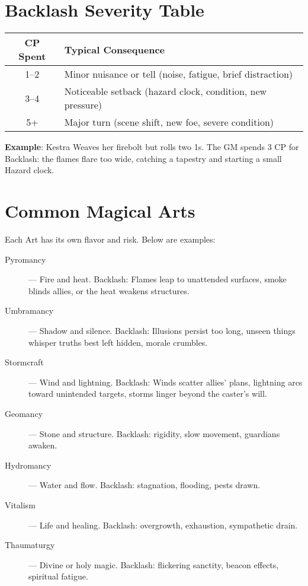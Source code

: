 \section*{Backlash Severity Table}

\begin{center}
\begin{tabular}{cl}
\toprule
\textbf{CP Spent} & \textbf{Typical Consequence} \\
\midrule
1--2 & Minor nuisance or tell (noise, fatigue, brief distraction) \\
3--4 & Noticeable setback (hazard clock, condition, new pressure) \\
5+ & Major turn (scene shift, new foe, severe condition) \\
\bottomrule
\end{tabular}
\end{center}

\textbf{Example}: Kestra Weaves her firebolt but rolls two 1s. The GM spends 3 CP for Backlash: the flames flare too wide, catching a tapestry and starting a small Hazard clock.

\section*{Common Magical Arts}

Each Art has its own flavor and risk. Below are examples:

\begin{description}
    \item[Pyromancy] --- Fire and heat. Backlash: Flames leap to unattended surfaces, smoke blinds allies, or the heat weakens structures.
    \item[Umbramancy] --- Shadow and silence. Backlash: Illusions persist too long, unseen things whisper truths best left hidden, morale crumbles.
    \item[Stormcraft] --- Wind and lightning. Backlash: Winds scatter allies' plans, lightning arcs toward unintended targets, storms linger beyond the caster's will.
    \item[Geomancy] --- Stone and structure. Backlash: rigidity, slow movement, guardians awaken.
    \item[Hydromancy] --- Water and flow. Backlash: stagnation, flooding, pests drawn.
    \item[Vitalism] --- Life and healing. Backlash: overgrowth, exhaustion, sympathetic drain.
    \item[Thaumaturgy] --- Divine or holy magic. Backlash: flickering sanctity, beacon effects, spiritual fatigue.
\end{description}

